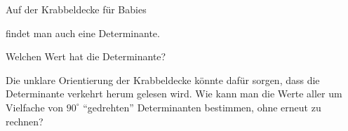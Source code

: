 Auf der Krabbeldecke für Babies
\begin{center}
\quad
{}
\end{center}
findet man auch eine Determinante.
\begin{teilaufgaben}
\item Welchen Wert hat die Determinante?
\item Die unklare Orientierung der Krabbeldecke könnte dafür sorgen, dass
die Determinante verkehrt herum gelesen wird.
Wie kann man die Werte aller um Vielfache von $90^\circ$ ``gedrehten''
Determinanten bestimmen, ohne erneut zu rechnen?
\end{teilaufgaben}


